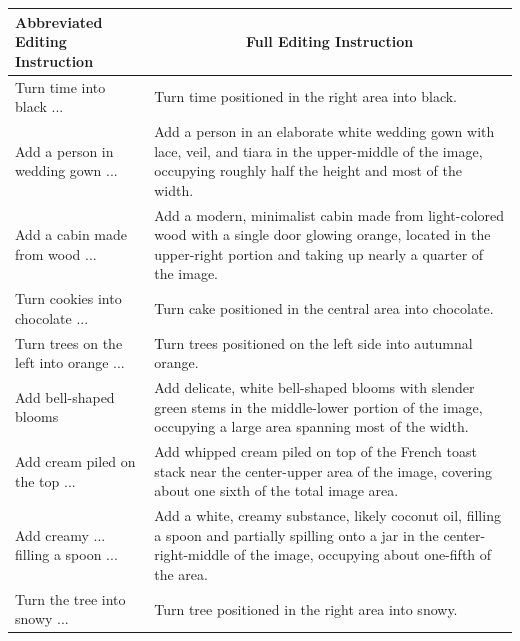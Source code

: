 \documentclass{llmxive}
\providecommand{\arraystretch}{1.18}
\begin{document}
\begin{table}[htbp]
\centering
\small
\setlength{\tabcolsep}{4pt}
\renewcommand{\arraystretch}{1.18}
\begin{tabularx}{\textwidth}{p{} X}
\toprule
\textbf{Abbreviated Editing Instruction} 
& \multicolumn{1}{c}{\textbf{Full Editing Instruction}} 
\\
\midrule

Turn time into black ...
& Turn time positioned in the right area into black.
\\
\midrule

Add a person in wedding gown ...
& Add a person in an elaborate white wedding gown with lace, veil, and tiara in the upper-middle of the image, occupying roughly half the height and most of the width.
\\
\midrule

Add a cabin made from wood ...
& Add a modern, minimalist cabin made from light-colored wood with a single door glowing orange, located in the upper-right portion and taking up nearly a quarter of the image.
\\
\midrule

Turn cookies into chocolate ...
& Turn cake positioned in the central area into chocolate.
\\
\midrule

Turn trees on the left into orange ...
& Turn trees positioned on the left side into autumnal orange.
\\
\midrule

Add bell-shaped blooms
& Add delicate, white bell-shaped blooms with slender green stems in the middle-lower portion of the image, occupying a large area spanning most of the width.
\\
\midrule

Add cream piled on the top ...
& Add whipped cream piled on top of the French toast stack near the center-upper area of the image, covering about one sixth of the total image area.
\\
\midrule

Add creamy ... filling a spoon ...
& Add a white, creamy substance, likely coconut oil, filling a spoon and partially spilling onto a jar in the center-right-middle of the image, occupying about one-fifth of the area.
\\
\midrule

Turn the tree into snowy ...
& Turn tree positioned in the right area into snowy.
\\
\midrule


\end{tabularx}
\end{table}
\end{document}
